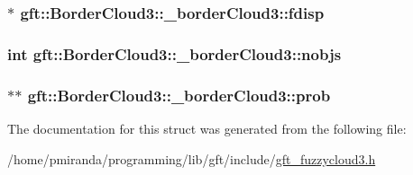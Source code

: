 \subsubsection[{\texorpdfstring{fdisp}{fdisp}}]{$\ast$ gft\+::\+Border\+Cloud3\+::\+\_\+border\+Cloud3\+::fdisp}\hypertarget{structgft_1_1BorderCloud3_1_1__borderCloud3_aa24ef7cdb7021c700f0148d2d137a753}{}\label{structgft_1_1BorderCloud3_1_1__borderCloud3_aa24ef7cdb7021c700f0148d2d137a753}
\subsubsection[{\texorpdfstring{nobjs}{nobjs}}]{\setlength{\rightskip}{0pt plus 5cm}int gft\+::\+Border\+Cloud3\+::\+\_\+border\+Cloud3\+::nobjs}\hypertarget{structgft_1_1BorderCloud3_1_1__borderCloud3_a9837901f9e28f40dd2918d9687e53582}{}\label{structgft_1_1BorderCloud3_1_1__borderCloud3_a9837901f9e28f40dd2918d9687e53582}
\subsubsection[{\texorpdfstring{prob}{prob}}]{$\ast$$\ast$ gft\+::\+Border\+Cloud3\+::\+\_\+border\+Cloud3\+::prob}\hypertarget{structgft_1_1BorderCloud3_1_1__borderCloud3_a3828cfea35d3619a113a52594662993d}{}\label{structgft_1_1BorderCloud3_1_1__borderCloud3_a3828cfea35d3619a113a52594662993d}


The documentation for this struct was generated from the following file\+:\begin{DoxyCompactItemize}
\item 
/home/pmiranda/programming/lib/gft/include/\hyperlink{gft__fuzzycloud3_8h}{gft\+\_\+fuzzycloud3.\+h}\end{DoxyCompactItemize}
